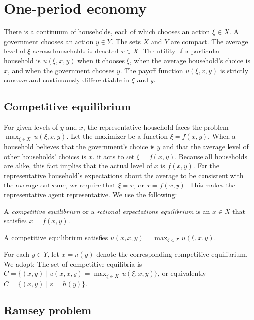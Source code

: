 \section{One-period economy}

There is a continuum of households, each of which chooses an action
$\xi \in X$.  A government chooses an action $y\in Y$.
The sets $X$ and $Y$ are compact. The average level
of $\xi$ across households is denoted $x \in X$.  The utility
of a particular household
is $u(\xi,x,y)$
when it chooses $\xi$, when the average
household's choice is $x$, and when the government chooses $y$.
  The payoff function $u(\xi,x,y)$ is
strictly concave and continuously differentiable in $\xi$ and $y$.

\subsection{Competitive equilibrium}

For given levels of $y$ and $x$, the representative household
faces the problem\ $\max_{\xi\in X}\,  u(\xi,x,y)$.  Let the
maximizer be a function $\xi = f(x,y)$.  When a household believes
that the government's choice is $y$ and that the average
level of other households' choices is $x$, it acts to set
$\xi = f(x,y)$.  Because all households are alike, this fact implies
that the actual level of $x$ is $f(x,y)$.  For the representative household's expectations about
the average to be consistent with the average outcome, we require
that $\xi=x$, or $x=f(x,y)$. This makes the representative
agent representative.   We use the following:

\medskip{} A {\it competitive equilibrium\/} or a {\it
rational expectations equilibrium\/} is
an $x\in X$ that satisfies $x=f (x,y)$.

\medskip\noindent
A competitive equilibrium satisfies $u(x,x,y) = \max_{\xi \in X}
u(\xi,x,y)$.

For each $y\in Y$, let $x=h(y)$ denote the corresponding competitive
equilibrium.  We  adopt:
\medskip{}  The set of competitive equilibria is
$C=\{ (x,y)\mid u(x,x,y) = \max_{\xi\in X}\,
u(\xi,x,y)\}$, or equivalently $C=\{ (x,y) \mid x= h(y)\}$.

\subsection{Ramsey problem}

